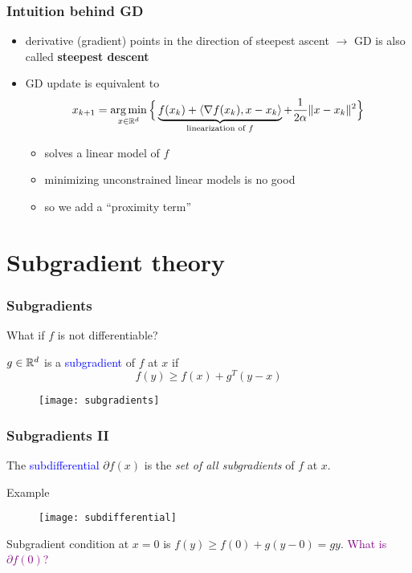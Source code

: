 \documentclass{beamer}
\begin{document}
\begin{frame}
  \frametitle{Intuition behind GD}
  \begin{itemize}
    \item derivative (gradient) points in the direction of steepest ascent
          $\rightarrow$ GD is also called \textbf{steepest descent}
    \item GD update is equivalent to
          \begin{equation}
            x_{k+1} = \operatorname*{arg\,min}_{x\in \mathbb{R}^d} \Big\{ \underbrace{f(x_k) + \langle \nabla f(x_k), x-x_k \rangle }_{\text{linearization of $f$}}+ \frac{1}{2 \alpha} \Vert x-x_k \Vert^2 \Big\}
          \end{equation}
          \begin{itemize}
            \item solves a linear model of $f$
            \item minimizing unconstrained linear models is no good
            \item so we add a ``proximity term''
          \end{itemize}
  \end{itemize}
\end{frame}


\section{Subgradient theory}%

\begin{frame}
  \frametitle{Subgradients}
  What if $f$ is not differentiable?
  \begin{definition}
    $g \in \mathbb{R}^d$ is a \textcolor{blue}{subgradient} of $f$ at $x$ if
    \begin{equation}
      f(y) \ge f(x) + g^T (y-x)
    \end{equation}
  \end{definition}
  \begin{figure}[ht]
    \centering
    \texttt{[image: subgradients]}
  \end{figure}
\end{frame}

\begin{frame}
  \frametitle{Subgradients II}
  \begin{definition}
    The \textcolor{blue}{subdifferential} $\partial f(x)$ is the \emph{set of all subgradients} of $f$ at $x$.
  \end{definition}
  Example
  \begin{figure}[ht]
    \centering
    \texttt{[image: subdifferential]}
  \end{figure}
  Subgradient condition at $x=0$ is $f(y)\ge f(0) + g(y-0) = gy$.
  \textcolor{purple}{What is $\partial f(0)$?}
\end{frame}
\end{document}
